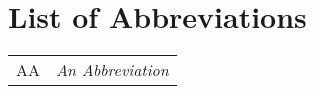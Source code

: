 \chapter*{List of Abbreviations}

\begin{table}[htbp]
\centering
\begin{tabular}{ll}

AA  	&	\textit{An Abbreviation}	\\

\end{tabular}
\end{table}